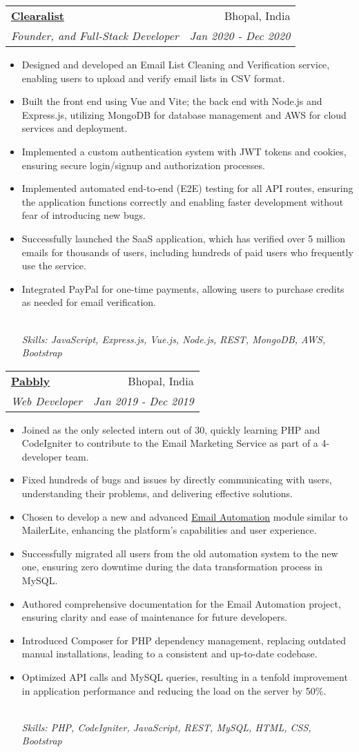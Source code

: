 \documentclass[letterpaper,12pt]{article}
\makeatletter
\newcommand{\resumeItem}[1]{
  \item\small{#1}\vspace{-2pt}
}
\newcommand{\resumeSubheading}[4]{
  \vspace{-2pt}\item
    \begin{tabular*}{0.97\textwidth}[t]{l@{\extracolsep{\fill}}r}
      \textbf{#1} & \small{#2} \\
      \emph{\small{#3}} & \emph{\small{#4}} \\
    \end{tabular*}\vspace{-5pt}
}
\newcommand{\resumeItemFooter}[1]{
    \\ \vspace{7pt}\hspace{-0.35in}\footnotesize\emph{#1}
}
\newcommand{\resumeItemListStart}{\begin{itemize}}
\newcommand{\resumeItemListEnd}{\end{itemize}\vspace{-5pt}}
\def\myHometown{Bhopal, India}
\def\clearalistLink{https://clearalist.com}
\def\pabblyLink{https://pabbly.com/email-marketing}
\def\emailAutomationLink{https://youtube.com/watch?v=kkopsVYOO7Y}
\makeatother
\begin{document}
\resumeSubheading
{\href{\clearalistLink}{\color{blue}Clearalist}}{\myHometown}
{Founder, and Full-Stack Developer}{Jan 2020 - Dec 2020}
\resumeItemListStart
\resumeItem{Designed and developed an Email List Cleaning and Verification service, enabling users to upload and verify email lists in CSV format.}
\resumeItem{Built the front end using Vue and Vite; the back end with Node.js and Express.js, utilizing MongoDB for database management and AWS for cloud services and deployment.}
\resumeItem{Implemented a custom authentication system with JWT tokens and cookies, ensuring secure login/signup and authorization processes.}
\resumeItem{Implemented automated end-to-end (E2E) testing for all API routes, ensuring the application functions correctly and enabling faster development without fear of introducing new bugs.}
\resumeItem{Successfully launched the SaaS application, which has verified over 5 million emails for thousands of users, including hundreds of paid users who frequently use the service.}
\resumeItem{Integrated PayPal for one-time payments, allowing users to purchase credits as needed for email verification.}
\resumeItemFooter{Skills: JavaScript, Express.js, Vue.js, Node.js, REST, MongoDB, AWS, Bootstrap}
\resumeItemListEnd

\resumeSubheading
{\href{\pabblyLink}{\color{blue}Pabbly}}{\myHometown}
{Web Developer}{Jan 2019 - Dec 2019}
\resumeItemListStart
\resumeItem{Joined as the only selected intern out of 30, quickly learning PHP and CodeIgniter to contribute to the Email Marketing Service as part of a 4-developer team.}
\resumeItem{Fixed hundreds of bugs and issues by directly communicating with users, understanding their problems, and delivering effective solutions.}
\resumeItem{Chosen to develop a new and advanced \href{\emailAutomationLink}{\color{blue}Email Automation} module similar to MailerLite, enhancing the platform's capabilities and user experience.}
\resumeItem{Successfully migrated all users from the old automation system to the new one, ensuring zero downtime during the data transformation process in MySQL.}
\resumeItem{Authored comprehensive documentation for the Email Automation project, ensuring clarity and ease of maintenance for future developers.}
\resumeItem{Introduced Composer for PHP dependency management, replacing outdated manual installations, leading to a consistent and up-to-date codebase.}
\resumeItem{Optimized API calls and MySQL queries, resulting in a tenfold improvement in application performance and reducing the load on the server by 50\%.}
\resumeItemFooter{Skills: PHP, CodeIgniter, JavaScript, REST, MySQL, HTML, CSS, Bootstrap}
\resumeItemListEnd
\end{document}
